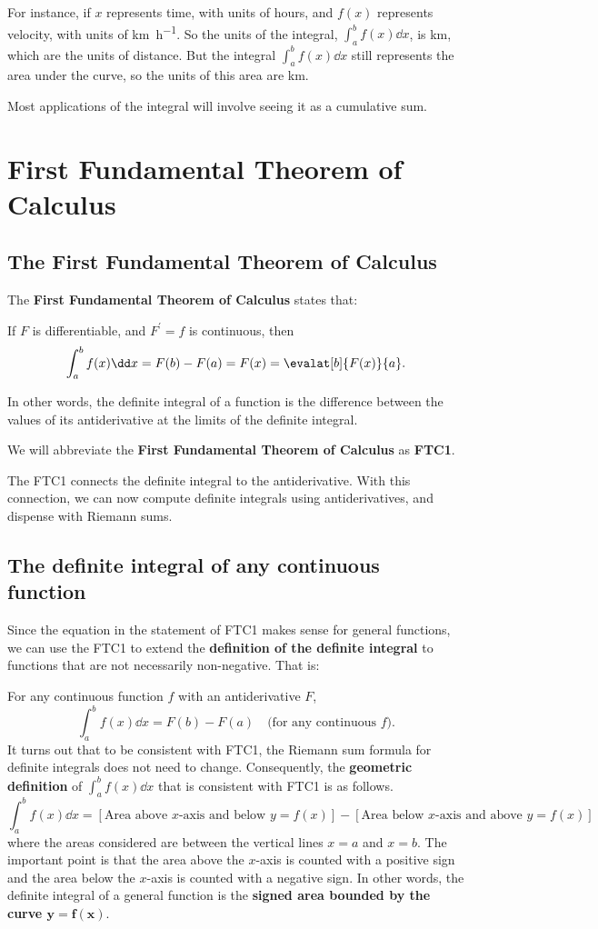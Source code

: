 For instance, if $x$ represents time, with units of hours, and $f(x)$ represents velocity, with units of \unit[per-mode=single-symbol]{\km\per\hour}. So the units of the integral, $\int_a^bf(x)\dd x$, is \unit{\km}, which are the units of distance. But the integral $\int_a^bf(x)\dd x$ still represents the area under the curve, so the units of this area are \unit{\km}.

Most applications of the integral will involve seeing it as a cumulative sum.
\section{First Fundamental Theorem of Calculus}
\subsection{The First Fundamental Theorem of Calculus}
The \textbf{First Fundamental Theorem of Calculus} states that:

If $F$ is differentiable, and $F^\prime=f$ is continuous, then
\[\int_a^bf(x)\dd x=F(b)-F(a)=F(x)=\evalat[b]{F(x)}{a}.\]

In other words, the definite integral of a function is the difference between the values of its antiderivative at the limits of the definite integral.

We will abbreviate the \textbf{First Fundamental Theorem of Calculus} as \textbf{FTC1}.

The FTC1 connects the definite integral to the antiderivative. With this connection, we can now compute definite integrals using antiderivatives, and dispense with Riemann sums.
\subsection{The definite integral of any continuous function}
Since the equation in the statement of FTC1 makes sense for general functions, we can use the FTC1 to extend the \textbf{definition of the definite integral} to functions that are not necessarily non-negative. That is:

For any continuous function $f$ with an antiderivative $F$,
\[\int_a^bf(x)\dd x=F(b)-F(a)\quad\text{(for any continuous $f$)}.\]
It turns out that to be consistent with FTC1, the Riemann sum formula for definite integrals does not need to change. Consequently, the \textbf{geometric definition} of $\int_a^bf(x)\dd x$ that is consistent with FTC1 is as follows.
\[\int_a^bf(x)\dd x=[\text{Area above $x$-axis and below $y=f(x)$}]-[\text{Area below $x$-axis and above $y=f(x)$}]\]
where the areas considered are between the vertical lines $x=a$ and $x=b$. The important point is that the area above the $x$-axis is counted with a positive sign and the area below the $x$-axis is counted with a negative sign. In other words, the definite integral of a general function is the \textbf{signed area bounded by the curve $\bm{y=f(x)}$}.

